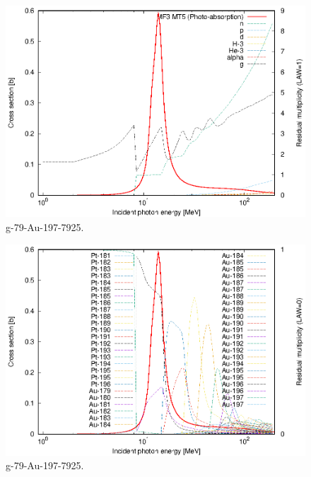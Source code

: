 \begin{figure}
 \includegraphics[width=\linewidth]{eps/g_79-Au-197_7925.eps}
  \caption{g-79-Au-197-7925.}
\end{figure}
\begin{figure}
 \includegraphics[width=\linewidth]{eps-law0/g_79-Au-197_7925.eps}
 \caption{g-79-Au-197-7925.}
\end{figure}
\newpage \clearpage

